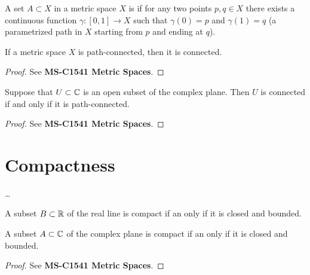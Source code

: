 \begin{definition}
  \label{def:path_connected}
  A set $A \subset X$ in a metric space $X$
  is  if for any two points $p, q \in X$
  there exists a continuous function $\gamma \colon [0,1] \to X$
  such that $\gamma(0) = p$ and $\gamma(1) = q$
  (a parametrized path in $X$ starting from $p$ and ending at $q$).
\end{definition}

\begin{lemma}
  \label{lem:path_connected_implies_connected}
  If a metric space $X$ is path-connected, then it is connected.
\end{lemma}
\begin{proof}
  See \textbf{MS-C1541 Metric Spaces}.
\end{proof}

\begin{lemma}
  \label{lem:open_connected_iff_path_connected}
  Suppose that $U \subset \mathbb{C}$ is an open subset of the complex plane.
  Then $U$ is connected if and only if it is path-connected.
\end{lemma}
\begin{proof}
  See \textbf{MS-C1541 Metric Spaces}.
\end{proof}

\section{Compactness}

\begin{definition}[Compactness]
  \label{def:compact}
  \ldots
\end{definition}

\begin{theorem}
  \label{thm:bolzano_weierstrass}
  A subset $B \subset \mathbb{R}$ of the real line is compact
  if an only if it is closed and bounded.

  A subset $A \subset \mathbb{C}$ of the complex plane is compact
  if an only if it is closed and bounded.
\end{theorem}
\begin{proof}
  See \textbf{MS-C1541 Metric Spaces}.
\end{proof}

